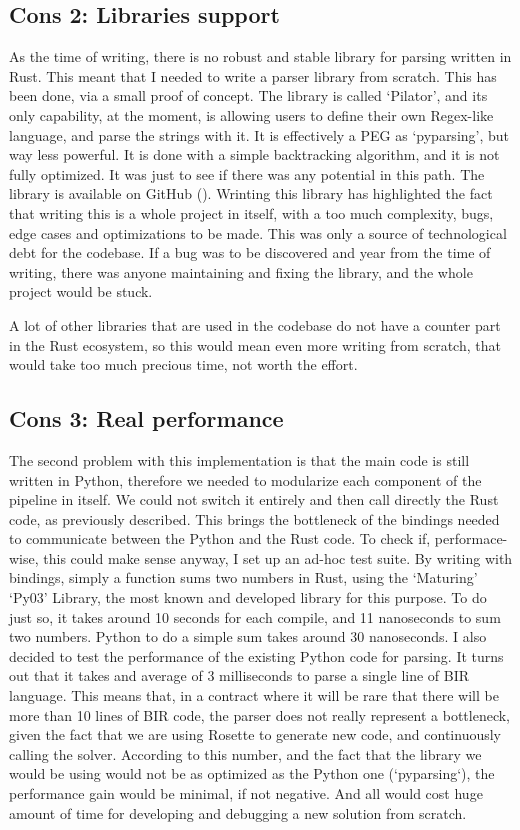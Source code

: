 \subsection[Libraries support]{Cons 2: Libraries support}
As the time of writing, there is no robust and stable library for parsing written
in Rust. This meant that I needed to write a parser library from scratch. This has
been done, via a small proof of concept. The library is called `Pilator', and
its only capability, at the moment, is allowing users to define their own Regex-like
language, and parse the strings with it. It is effectively a PEG as `pyparsing',
but way less powerful. It is done with a simple backtracking algorithm, and it is
not fully optimized. It was just to see if there was any potential in this path.
The library is available on GitHub (\cite{pilator}). Wrinting this library has
highlighted the fact that writing this is a whole project in itself, with a too much
complexity, bugs, edge cases and optimizations to be made. This was only a
source of technological debt for the codebase. If a bug was to be discovered and
year from the time of writing, there was anyone maintaining and fixing the
library, and the whole project would be stuck.

A lot of other libraries that are used in the codebase do not have a counter part
in the Rust ecosystem, so this would mean even more writing from scratch, that would
take too much precious time, not worth the effort.

\subsection[Real performance]{Cons 3: Real performance}
The second problem with this implementation is that the main code is still
written in Python, therefore we needed to modularize each component of the pipeline
in itself. We could not switch it entirely and then call directly the Rust code,
as previously described. This brings the bottleneck of the bindings needed to
communicate between the Python and the Rust code. To check if, performace-wise, this
could make sense anyway, I set up an ad-hoc test suite. By writing with bindings,
simply a function sums two numbers in Rust, using the `Maturing' `Py03' Library,
the most known and developed library for this purpose. To do just so, it takes
around 10 seconds for each compile, and 11 nanoseconds to sum two numbers.
Python to do a simple sum takes around 30 nanoseconds. I also decided to test the
performance of the existing Python code for parsing. It turns out that it takes
and average of 3 milliseconds to parse a single line of BIR language. This means
that, in a contract where it will be rare that there will be more than 10 lines
of BIR code, the parser does not really represent a bottleneck, given the fact
that we are using Rosette to generate new code, and continuously calling the solver.
According to this number, and the fact that the library we would be using would not
be as optimized as the Python one (`pyparsing`), the performance gain would be
minimal, if not negative. And all would cost huge amount of time for developing
and debugging a new solution from scratch.


